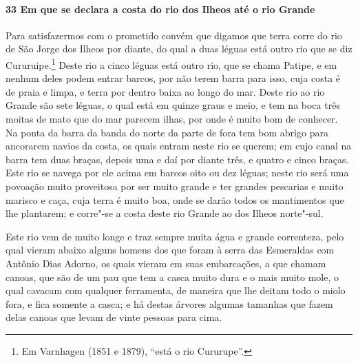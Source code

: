 \paragraph{33 Em que se declara a costa do rio dos Ilheos até o rio Grande}

Para satisfazermos com o prometido convém que digamos que terra corre do rio de São Jorge
dos Ilheos por diante, do qual a duas léguas está outro rio que se diz
Cururuipe.\footnote{ Em Varnhagen (1851 e 1879), ``está o rio Cururupe''.} Deste rio a
cinco léguas está outro rio, que se chama Patipe, e em nenhum deles podem entrar barcos,
por não terem barra para isso, cuja costa é de praia e limpa, e terra por dentro baixa ao
longo do mar. Deste rio ao rio Grande são sete léguas, o qual está em quinze graus e meio,
e tem na boca três moitas de mato que do mar parecem ilhas, por onde é muito bom de
conhecer. Na ponta da barra da banda do norte da parte de fora tem bom abrigo para
ancorarem navios da costa, os quais entram neste rio se querem; em cujo canal na barra tem
duas braças, depois uma e daí por diante três, e quatro e cinco braças. Este rio se navega
por ele acima em barcos oito ou dez léguas; neste rio será uma povoação muito proveitosa
por ser muito grande e ter grandes pescarias e muito marisco e caça, cuja terra é muito
boa, onde se darão todos os mantimentos que lhe plantarem; e corre"-se a costa deste rio
Grande ao dos Ilheos norte"-sul.

Este rio vem de muito longe e traz sempre muita água e grande correnteza, pelo qual vieram
abaixo alguns homens dos que foram à serra das Esmeraldas com Antônio Dias Adorno, os
quais vieram em suas embarcações, a que chamam canoas, que são de um pau que tem a casca
muito dura e o mais muito mole, o qual cavacam com qualquer ferramenta, de maneira que lhe
deitam todo o miolo fora, e fica somente a casca; e há destas árvores algumas tamanhas que
fazem delas canoas que levam de vinte pessoas para cima.

